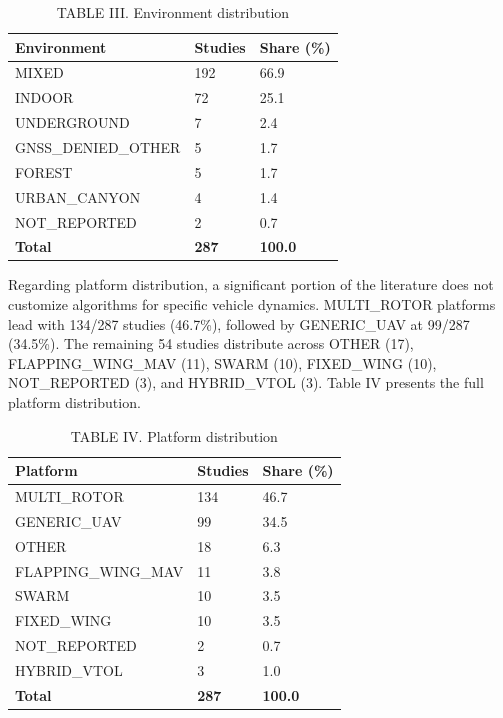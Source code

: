 \documentclass[conference]{IEEEtran}
\begin{document}
\begin{table}[htbp]
\centering
\caption{TABLE III. Environment distribution}
\label{tab:3}
\begin{tabular}{l l l}
\hline
Environment & Studies & Share (\%) \\
\hline
MIXED & 192 & 66.9 \\
\hline
INDOOR & 72 & 25.1 \\
\hline
UNDERGROUND & 7 & 2.4 \\
\hline
GNSS\_DENIED\_OTHER & 5 & 1.7 \\
\hline
FOREST & 5 & 1.7 \\
\hline
URBAN\_CANYON & 4 & 1.4 \\
\hline
NOT\_REPORTED & 2 & 0.7 \\
\hline
\textbf{Total} & \textbf{287} & \textbf{100.0} \\
\hline
\end{tabular}
\end{table}



Regarding platform distribution, a significant portion of the literature does not customize algorithms for specific vehicle dynamics. MULTI\_ROTOR platforms lead with 134/287 studies (46.7\%), followed by GENERIC\_UAV at 99/287 (34.5\%). The remaining 54 studies distribute across OTHER (17), FLAPPING\_WING\_MAV (11), SWARM (10), FIXED\_WING (10), NOT\_REPORTED (3), and HYBRID\_VTOL (3). Table IV presents the full platform distribution.



\begin{table}[htbp]
\centering
\caption{TABLE IV. Platform distribution}
\label{tab:4}
\begin{tabular}{l l l}
\hline
Platform & Studies & Share (\%) \\
\hline
MULTI\_ROTOR & 134 & 46.7 \\
\hline
GENERIC\_UAV & 99 & 34.5 \\
\hline
OTHER & 18 & 6.3 \\
\hline
FLAPPING\_WING\_MAV & 11 & 3.8 \\
\hline
SWARM & 10 & 3.5 \\
\hline
FIXED\_WING & 10 & 3.5 \\
\hline
NOT\_REPORTED & 2 & 0.7 \\
\hline
HYBRID\_VTOL & 3 & 1.0 \\
\hline
\textbf{Total} & \textbf{287} & \textbf{100.0} \\
\hline
\end{tabular}
\end{table}
\end{document}

